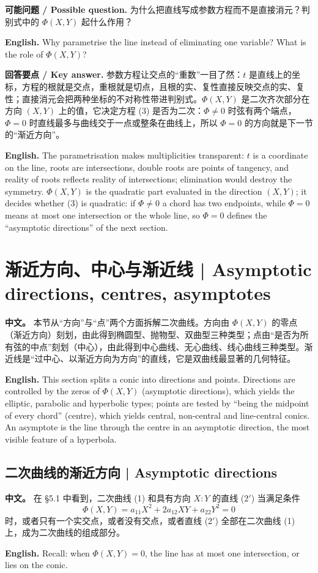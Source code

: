 \documentclass[UTF8,11pt,a4paper]{ctexart}
\newcommand{\APS}[2]{\par\noindent\textbf{中文。} #1\par\noindent\textbf{English.} #2\par\smallskip}
\newcommand{\EN}[1]{\par\noindent \textbf{English.} #1\par}
\newcommand{\ASK}[4]{\par\noindent \textbf{可能问题 / Possible question.} #1\par\EN{#2}\noindent \textbf{回答要点 / Key answer.} #3\par\EN{#4}\medskip}
\theoremstyle{definition}
\begin{document}
\ASK{为什么把直线写成参数方程而不是直接消元？判别式中的 $\Phi(X,Y)$ 起什么作用？}{Why parametrise the line instead of eliminating one variable? What is the role of $\Phi(X,Y)$?}{参数方程让交点的``重数''一目了然：$t$ 是直线上的坐标，方程的根就是交点，重根就是切点，且根的实、复性直接反映交点的实、复性；直接消元会把两种坐标的不对称性带进判别式。$\Phi(X,Y)$ 是二次齐次部分在方向 $(X,Y)$ 上的值，它决定方程 (3) 是否为二次：$\Phi\ne0$ 时弦有两个端点，$\Phi=0$ 时直线最多与曲线交于一点或整条在曲线上，所以 $\Phi=0$ 的方向就是下一节的``渐近方向''。}{The parametrisation makes multiplicities transparent: $t$ is a coordinate on the line, roots are intersections, double roots are points of tangency, and reality of roots reflects reality of intersections; elimination would destroy the symmetry. $\Phi(X,Y)$ is the quadratic part evaluated in the direction $(X,Y)$; it decides whether (3) is quadratic: if $\Phi\ne0$ a chord has two endpoints, while $\Phi=0$ means at most one intersection or the whole line, so $\Phi=0$ defines the ``asymptotic directions'' of the next section.}

\section{\label{sec:10}渐近方向、中心与渐近线 | Asymptotic directions, centres, asymptotes}
\APS{本节从``方向''与``点''两个方面拆解二次曲线。方向由 $\Phi(X,Y)$ 的零点（渐近方向）刻划，由此得到椭圆型、抛物型、双曲型三种类型；点由``是否为所有弦的中点''刻划（中心），由此得到中心曲线、无心曲线、线心曲线三种类型。渐近线是``过中心、以渐近方向为方向''的直线，它是双曲线最显著的几何特征。}{This section splits a conic into directions and points. Directions are controlled by the zeros of $\Phi(X,Y)$ (asymptotic directions), which yields the elliptic, parabolic and hyperbolic types; points are tested by ``being the midpoint of every chord'' (centre), which yields central, non-central and line-central conics. An asymptote is the line through the centre in an asymptotic direction, the most visible feature of a hyperbola.}

\subsection{二次曲线的渐近方向 | Asymptotic directions}
\APS{在 §5.1 中看到，二次曲线 (1) 和具有方向 $X:Y$ 的直线 (2$'$) 当满足条件
\[
\Phi(X,Y)=a_{11}X^2+2a_{12}XY+a_{22}Y^2=0\tag{3}
\]
时，或者只有一个实交点，或者没有交点，或者直线 (2$'$) 全部在二次曲线 (1) 上，成为二次曲线的组成部分。}{Recall: when $\Phi(X,Y)=0$, the line has at most one intersection, or lies on the conic.}
\end{document}
